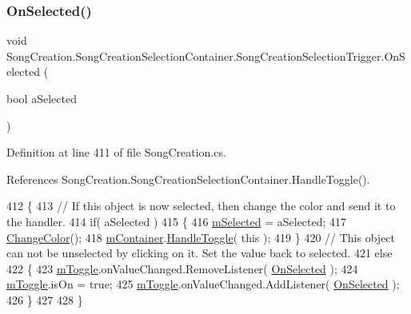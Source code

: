 \subsubsection{\texorpdfstring{On\+Selected()}{OnSelected()}}
{\footnotesize\ttfamily void Song\+Creation.\+Song\+Creation\+Selection\+Container.\+Song\+Creation\+Selection\+Trigger.\+On\+Selected (\begin{DoxyParamCaption}\item[{bool}]{a\+Selected }\end{DoxyParamCaption})}



Definition at line 411 of file Song\+Creation.\+cs.



References Song\+Creation.\+Song\+Creation\+Selection\+Container.\+Handle\+Toggle().


\begin{DoxyCode}
412             \{
413                 \textcolor{comment}{// If this object is now selected, then change the color and send it to the handler.}
414                 \textcolor{keywordflow}{if}( aSelected )
415                 \{
416                     \hyperlink{group___s_c_handlers_ga49ffd4516ec7982b1683a44b4f22de74}{mSelected} = aSelected;
417                     \hyperlink{group___s_c_handlers_ga3e790d06e364f26ed6f8a78cb87bbf6d}{ChangeColor}();
418                     \hyperlink{group___s_c_handlers_ga23a094f17b949a4ea153f66c73e42578}{mContainer}.\hyperlink{group___s_c_handlers_gad63b337e8edf4296db87f6753d187f97}{HandleToggle}( \textcolor{keyword}{this} );
419                 \}
420                 \textcolor{comment}{// This object can not be unselected by clicking on it. Set the value back to selected.}
421                 \textcolor{keywordflow}{else}
422                 \{
423                     \hyperlink{group___s_c_handlers_gaffc6248c907c4357b0a0a30b86635f3a}{mToggle}.onValueChanged.RemoveListener( \hyperlink{group___s_c_handlers_ga33e6eb8e123cb32f40c2c06149a31087}{OnSelected} );
424                     \hyperlink{group___s_c_handlers_gaffc6248c907c4357b0a0a30b86635f3a}{mToggle}.isOn = \textcolor{keyword}{true};
425                     \hyperlink{group___s_c_handlers_gaffc6248c907c4357b0a0a30b86635f3a}{mToggle}.onValueChanged.AddListener( \hyperlink{group___s_c_handlers_ga33e6eb8e123cb32f40c2c06149a31087}{OnSelected} );
426                 \}
427 
428             \}
\end{DoxyCode}
\mbox{\label{group___s_c_handlers_ga929912496540563f4ec02295a0d333c6}} 
